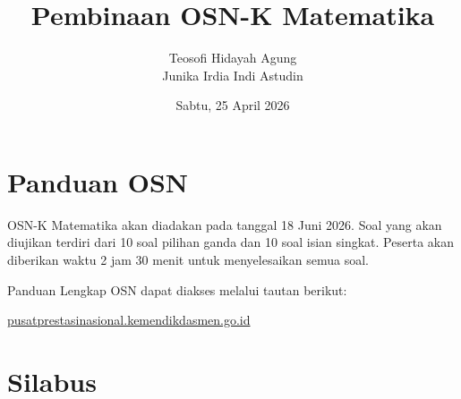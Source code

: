 \documentclass[aspectratio=169]{beamer}
\date{Sabtu, 25 April 2026}
\title[OSK Matematika]{Pembinaan OSN-K Matematika}
\author[Tew \& Jun]{Teosofi Hidayah Agung\\Junika Irdia Indi Astudin}
\institute[Man 1 Pasuruan]{MAN 1 Pasuruan}
\theoremstyle{definition}
\begin{document}
\begin{frame}
  \titlepage
\end{frame}


\section{Panduan OSN}
\begin{frame}{\insertsection}
  OSN-K Matematika akan diadakan pada tanggal 18 Juni 2026. Soal yang akan diujikan terdiri dari 10 soal pilihan ganda dan 10 soal isian singkat. Peserta akan diberikan waktu 2 jam 30 menit untuk menyelesaikan semua soal.

  \vspace{0.5cm}

  Panduan Lengkap OSN dapat diakses melalui tautan berikut:
  \begin{center}
    \color{blue}\href{https://pusatprestasinasional.kemendikdasmen.go.id/event/riset-dan-inovasi/sma/olimpiade-sains-nasional-2026-2026-sma}{pusatprestasinasional.kemendikdasmen.go.id}
  \end{center}
\end{frame}

\section{Silabus}
\end{document}

